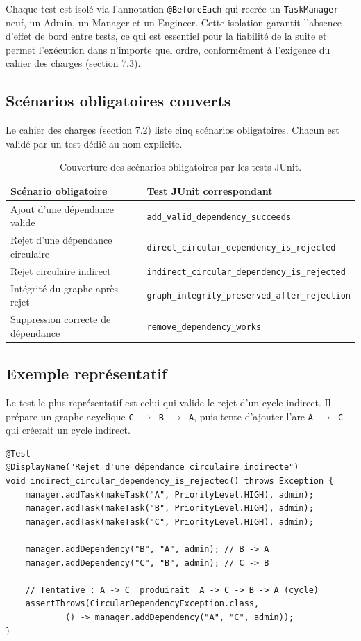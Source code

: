 \documentclass[11pt]{article}
\begin{document}
Chaque test est isolé via l'annotation \texttt{@BeforeEach} qui recrée
un \texttt{TaskManager} neuf, un Admin, un Manager et un Engineer. Cette
isolation garantit l'absence d'effet de bord entre tests, ce qui est
essentiel pour la fiabilité de la suite et permet l'exécution dans
n'importe quel ordre, conformément à l'exigence du cahier des charges
(section 7.3).

\subsection{Scénarios obligatoires couverts}
Le cahier des charges (section 7.2) liste cinq scénarios obligatoires.
Chacun est validé par un test dédié au nom explicite.

\begin{table}[H]
\centering
\small
\begin{tabular}{lp{6.5cm}}
\toprule
\textbf{Scénario obligatoire} & \textbf{Test JUnit correspondant} \\
\midrule
Ajout d'une dépendance valide        & \texttt{add\_valid\_dependency\_succeeds} \\
Rejet d'une dépendance circulaire    & \texttt{direct\_circular\_dependency\_is\_rejected} \\
Rejet circulaire indirect            & \texttt{indirect\_circular\_dependency\_is\_rejected} \\
Intégrité du graphe après rejet     & \texttt{graph\_integrity\_preserved\_after\_rejection} \\
Suppression correcte de dépendance  & \texttt{remove\_dependency\_works} \\
\bottomrule
\end{tabular}
\caption{Couverture des scénarios obligatoires par les tests JUnit.}
\end{table}

\subsection{Exemple représentatif}
Le test le plus représentatif est celui qui valide le rejet d'un cycle
indirect. Il prépare un graphe acyclique \texttt{C $\to$ B $\to$ A},
puis tente d'ajouter l'arc \texttt{A $\to$ C} qui créerait un cycle
indirect.

\begin{lstlisting}[caption={Test du rejet d'une dépendance circulaire indirecte}]
@Test
@DisplayName("Rejet d'une dépendance circulaire indirecte")
void indirect_circular_dependency_is_rejected() throws Exception {
    manager.addTask(makeTask("A", PriorityLevel.HIGH), admin);
    manager.addTask(makeTask("B", PriorityLevel.HIGH), admin);
    manager.addTask(makeTask("C", PriorityLevel.HIGH), admin);

    manager.addDependency("B", "A", admin); // B -> A
    manager.addDependency("C", "B", admin); // C -> B

    // Tentative : A -> C  produirait  A -> C -> B -> A (cycle)
    assertThrows(CircularDependencyException.class,
            () -> manager.addDependency("A", "C", admin));
}
\end{lstlisting}
\end{document}
